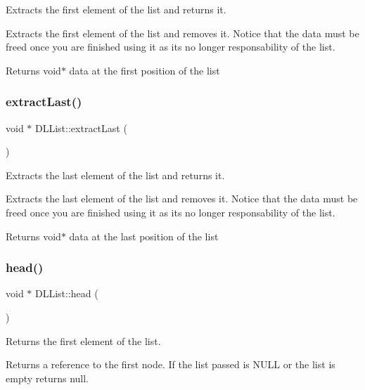 Extracts the first element of the list and returns it. 

Extracts the first element of the list and removes it. Notice that the data must be freed once you are finished using it as it\textquotesingle{}s no longer responsability of the list.

\begin{DoxyReturn}{Returns}
void$\ast$ data at the first position of the list 
\end{DoxyReturn}
\mbox{\label{class_d_l_list_a4e9d658a550a11331950f8b01f0ca43f}} 
\subsubsection{\texorpdfstring{extract\+Last()}{extractLast()}}
{\footnotesize\ttfamily void $\ast$ D\+L\+List\+::extract\+Last (\begin{DoxyParamCaption}{ }\end{DoxyParamCaption})}



Extracts the last element of the list and returns it. 

Extracts the last element of the list and removes it. Notice that the data must be freed once you are finished using it as it\textquotesingle{}s no longer responsability of the list.

\begin{DoxyReturn}{Returns}
void$\ast$ data at the last position of the list 
\end{DoxyReturn}
\mbox{\label{class_d_l_list_ab59e7efc3cd0aef304a93d214fb7343a}} 
\subsubsection{\texorpdfstring{head()}{head()}}
{\footnotesize\ttfamily void $\ast$ D\+L\+List\+::head (\begin{DoxyParamCaption}{ }\end{DoxyParamCaption})}



Returns the first element of the list. 

Returns a reference to the first node. If the list passed is N\+U\+LL or the list is empty returns null.

